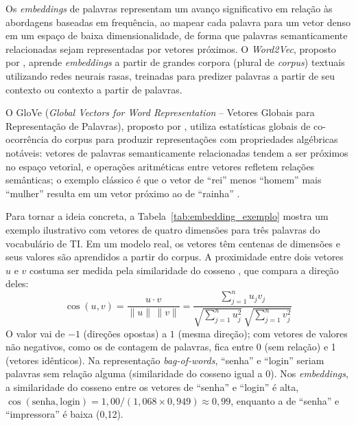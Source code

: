 \documentclass[
    12pt,                %
    openright,           %
    oneside,             %
    a4paper,             %
    english,             %
    brazil               %
]{abntex2}
\begin{document}
\label{subsubsec:pln_embeddings}

Os \textit{embeddings} de palavras representam um avanço significativo em relação às abordagens baseadas em frequência, ao mapear cada palavra para um vetor denso em um espaço de baixa dimensionalidade, de forma que palavras semanticamente relacionadas sejam representadas por vetores próximos. O \textit{Word2Vec}, proposto por , aprende \textit{embeddings} a partir de grandes corpora (plural de \textit{corpus}) textuais utilizando redes neurais rasas, treinadas para predizer palavras a partir de seu contexto ou contexto a partir de palavras.

O GloVe (\textit{Global Vectors for Word Representation} -- Vetores Globais para Representação de Palavras), proposto por , utiliza estatísticas globais de co-ocorrência do corpus para produzir representações com propriedades algébricas notáveis: vetores de palavras semanticamente relacionadas tendem a ser próximos no espaço vetorial, e operações aritméticas entre vetores refletem relações semânticas; o exemplo clássico é que o vetor de ``rei'' menos ``homem'' mais ``mulher'' resulta em um vetor próximo ao de ``rainha'' \cite{mikolov2013}.

Para tornar a ideia concreta, a Tabela~\ref{tab:embedding_exemplo} mostra um exemplo ilustrativo com vetores de quatro dimensões para três palavras do vocabulário de TI. Em um modelo real, os vetores têm centenas de dimensões e seus valores são aprendidos a partir do corpus. A proximidade entre dois vetores $u$ e $v$ costuma ser medida pela similaridade do cosseno \cite{mikolov2013,pennington2014}, que compara a direção deles:
\begin{equation}
\cos(u,v) = \frac{u \cdot v}{\lVert u \rVert \, \lVert v \rVert}
          = \frac{\sum_{j=1}^{n} u_j v_j}{\sqrt{\sum_{j=1}^{n} u_j^2}\,\sqrt{\sum_{j=1}^{n} v_j^2}}
\label{eq:cosseno}
\end{equation}
O valor vai de $-1$ (direções opostas) a $1$ (mesma direção); com vetores de valores não negativos, como os de contagem de palavras, fica entre 0 (sem relação) e 1 (vetores idênticos). Na representação \textit{bag-of-words}, ``senha'' e ``login'' seriam palavras sem relação alguma (similaridade do cosseno igual a 0). Nos \textit{embeddings}, a similaridade do cosseno entre os vetores de ``senha'' e ``login'' é alta, $\cos(\text{senha},\text{login}) = 1{,}00 / (1{,}068 \times 0{,}949) \approx 0{,}99$, enquanto a de ``senha'' e ``impressora'' é baixa (0,12).
\end{document}
